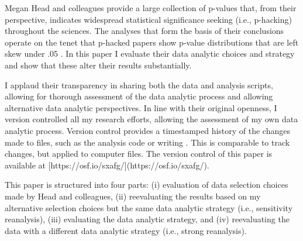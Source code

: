 Megan Head and colleagues provide a large collection of p-values that, from their perspective, indicates widespread statistical significance seeking (i.e., p-hacking) throughout the sciences. The analyses that form the basis of their conclusions operate on the tenet that p-hacked papers show p-value distributions that are left skew under .05 \cite{Simonsohn2014}. In this paper I evaluate their data analytic choices and strategy and show that these alter their results substantially. 

I applaud their transparency in sharing both the data and analysis scripts, allowing for thorough assessment of the data analytic process and allowing alternative data analytic perspectives. In line with their original openness, I version controlled all my research efforts, allowing the assessment of my own data analytic process. Version control provides a timestamped history of the changes made to files, such as the analysis code or writing \cite{Ram2013}. This is comparable to track changes, but applied to computer files. The version control of this paper is available at [https://osf.io/sxafg/](https://osf.io/sxafg/).

This paper is structured into four parts: (i) evaluation of data selection choices made by Head and colleagues, (ii) reevaluating the results based on my alternative selection choices but the same data analytic strategy (i.e., sensitivity reanalysis), (iii) evaluating the data analytic strategy, and (iv) reevaluating the data with a different data analytic strategy (i.e., strong reanalysis). 